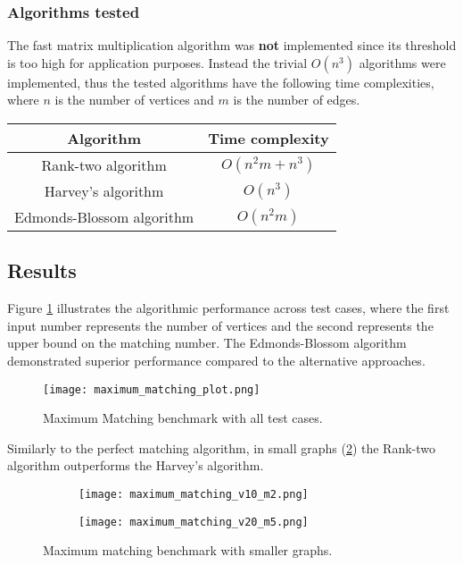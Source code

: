 \subsubsection{Algorithms tested}
The fast matrix multiplication algorithm was \textbf{not} implemented since its threshold is too high for application purposes.
Instead the trivial $O(n^3)$ algorithms were implemented, thus the tested algorithms have the following time complexities, where \(n\) is the number of vertices and \(m\) is the number of edges.
\begin{center}
  \begin{tabular}{|c|c|}
    \hline
    Algorithm & Time complexity \\
    \hline
    Rank-two algorithm & \(O(n^2m + n^3)\) \\
    Harvey's algorithm & \(O(n^3)\) \\
    Edmonds-Blossom algorithm & \(O(n^2m)\) \\
    \hline
  \end{tabular}
\end{center}

\subsection{Results}
\label{results:max_matching}

Figure \cref{fig:max_matching} illustrates the algorithmic performance across test cases,
where the first input number represents the number of vertices and the second represents the upper bound on the matching number.
The Edmonds-Blossom algorithm demonstrated superior performance compared to the alternative approaches.

\begin{figure}[H]
  \centering
  \texttt{[image: maximum\_matching\_plot.png]}
  \caption{Maximum Matching benchmark with all test cases.}
  \label{fig:max_matching}
\end{figure}

Similarly to the perfect matching algorithm, in small graphs (\cref{fig:v10m2-v20m5}) the Rank-two algorithm outperforms the Harvey's algorithm.

\begin{figure}[H]
  \centering
  \begin{subfigure}{.5\textwidth}
    \centering
    \texttt{[image: maximum\_matching\_v10\_m2.png]}
  \end{subfigure}%
  \begin{subfigure}{.5\textwidth}
    \centering
    \texttt{[image: maximum\_matching\_v20\_m5.png]}
  \end{subfigure}
  \caption{Maximum matching benchmark with smaller graphs.}
  \label{fig:v10m2-v20m5}
\end{figure}

